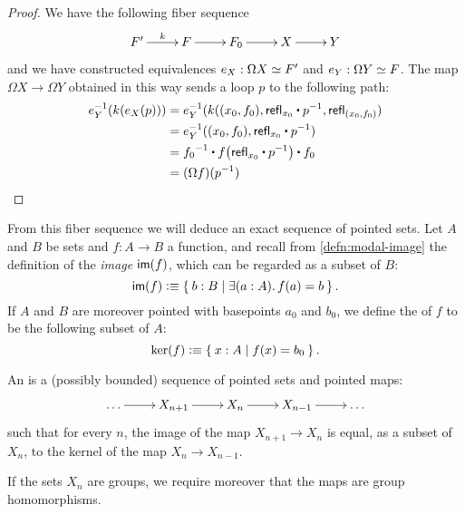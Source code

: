 \begin{proof}
  We have the following fiber sequence
  \[\xymatrix{F' \ar^-k[r] & F \ar[r] & F_0 \ar[r] & X \ar[r] & Y}\]
  and we have constructed equivalences $e_X:\Omega X \simeq F'$ and
  $e_Y:\Omega Y \simeq F$. The map $\Omega X\to\Omega Y$ obtained in this way
  sends a loop $p$ to the following path:
  \begin{align*}
    e_Y^{-1}(k(e_X(p))) &=
    e_Y^{-1}(k((x_0,f_0),\refl{x_0}\ct\rev{p},\refl{(x_0,f_0)}) \\
    &= e_Y^{-1}((x_0,f_0),\refl{x_0}\ct\rev{p}) \\
    &= \rev{f_0}\ct\ap{f}{\refl{x_0}\ct\rev{p}}\ct f_0 \\
    &= (\Omega f)(\rev{p}) \qedhere
  \end{align*}
\end{proof}

From this fiber sequence we will deduce an exact sequence of pointed sets.
%
Let $A$ and $B$ be sets and $f:A\to B$ a function, and recall from \autoref{defn:modal-image} the definition of the \emph{image} $\mathsf{im}(f)$, which can be regarded as a subset of $B$:
\[\im(f) \defeq \setof{b:B | \exis{a:A} f(a)=b}. \]
If $A$ and $B$ are moreover pointed with basepoints $a_0$ and $b_0$, we define the 
%
%
of $f$ to be the following subset of $A$:
\[\ker(f) \vcentcolon\equiv \Set{x:A | f(x) = b_0}. \]

\begin{defn}
  An 
  is a (possibly bounded) sequence of pointed sets
  and pointed maps:
  \[\xymatrix{\dots \ar[r] & X_{n+1} \ar[r] & X_n \ar[r] & X_{n-1} \ar[r] &
    \dots}\]
  such that for every $n$, the image of the map $X_{n+1} \to X_n$ is equal, as a subset of $X_n$, to the kernel of the map $X_n \to X_{n-1}$.

  If the sets $X_n$ are groups, we require moreover that the maps are group homomorphisms.
\end{defn}


